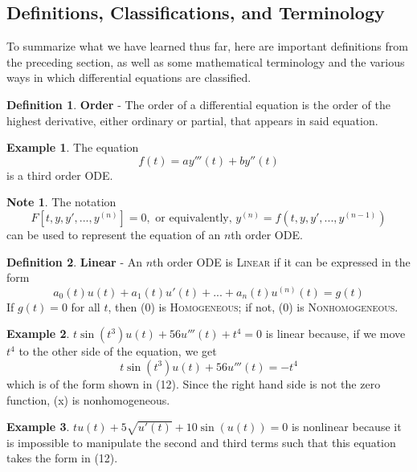 \documentclass[11pt]{article}
\theoremstyle{definition}
\newtheorem{defn}{Definition}
\newtheorem{ex}{Example}
\newtheorem*{note*}{Note}
\begin{document}
\subsection{Definitions, Classifications, and Terminology}
To summarize what we have learned thus far, here are important definitions from the preceding section, as well as some mathematical terminology and the various ways in which differential equations are classified.
\begin{shaded}
\begin{defn}
\textbf{Order} - The order of a differential equation is the order of the highest derivative, either ordinary or partial, that appears in said equation.
\end{defn}
\end{shaded}
\begin{ex} The equation
\begin{equation}
f(t) = ay'''(t) + by''(t)
\end{equation}
is a third order ODE.
\end{ex}
\begin{note*}
    The notation \begin{equation}
        F[t, y, y', ..., y^{(n)}] = 0, \text{ or equivalently, }y^{(n)} = f(t, y, y', ..., y^{(n-1)})
    \end{equation} can be used to represent the equation of an $n$th order ODE.
\end{note*}
\begin{shaded}
\begin{defn}
\textbf{Linear} - An $n$th order ODE is \textsc{Linear} if it can be expressed in the form \begin{equation}a_0(t)u(t) + a_1(t)u'(t) + ... + a_n(t)u^{(n)}(t) = g(t)\end{equation} If $g(t) = 0$ for all $t$, then (0) is \textsc{Homogeneous}; if not, (0) is \textsc{Nonhomogeneous}.
\end{defn}
\end{shaded}
\begin{ex}
    $t\sin{(t^3)}u(t) + 56u'''(t) + t^4 = 0$ is linear because, if we move $t^4$ to the other side of the equation, we get
    \begin{equation}t\sin{(t^3)}u(t) + 56u'''(t) = -t^4\end{equation} which is of the form shown in (12). Since the right hand side is not the zero function, (x) is nonhomogeneous.
\end{ex}
\begin{ex}
    $tu(t) + 5\sqrt{u'(t)} + 10\sin{(u(t))} = 0$ is nonlinear because it is impossible to manipulate the second and third terms such that this equation takes the form in (12).
\end{ex}
\end{document}
